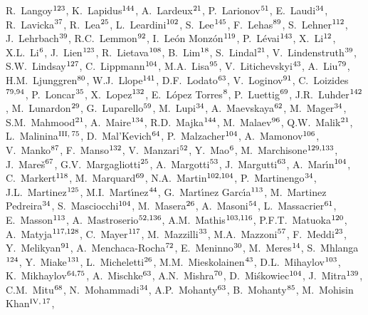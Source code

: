 \begin{flushleft}
R.~Langoy$^{\rm 123}$, 
K.~Lapidus$^{\rm 144}$, 
A.~Lardeux$^{\rm 21}$, 
P.~Larionov$^{\rm 51}$, 
E.~Laudi$^{\rm 34}$, 
R.~Lavicka$^{\rm 37}$, 
R.~Lea$^{\rm 25}$, 
L.~Leardini$^{\rm 102}$, 
S.~Lee$^{\rm 145}$, 
F.~Lehas$^{\rm 89}$, 
S.~Lehner$^{\rm 112}$, 
J.~Lehrbach$^{\rm 39}$, 
R.C.~Lemmon$^{\rm 92}$, 
I.~Le\'{o}n Monz\'{o}n$^{\rm 119}$, 
P.~L\'{e}vai$^{\rm 143}$, 
X.~Li$^{\rm 12}$, 
X.L.~Li$^{\rm 6}$, 
J.~Lien$^{\rm 123}$, 
R.~Lietava$^{\rm 108}$, 
B.~Lim$^{\rm 18}$, 
S.~Lindal$^{\rm 21}$, 
V.~Lindenstruth$^{\rm 39}$, 
S.W.~Lindsay$^{\rm 127}$, 
C.~Lippmann$^{\rm 104}$, 
M.A.~Lisa$^{\rm 95}$, 
V.~Litichevskyi$^{\rm 43}$, 
A.~Liu$^{\rm 79}$, 
H.M.~Ljunggren$^{\rm 80}$, 
W.J.~Llope$^{\rm 141}$, 
D.F.~Lodato$^{\rm 63}$, 
V.~Loginov$^{\rm 91}$, 
C.~Loizides$^{\rm 79,94}$, 
P.~Loncar$^{\rm 35}$, 
X.~Lopez$^{\rm 132}$, 
E.~L\'{o}pez Torres$^{\rm 8}$, 
P.~Luettig$^{\rm 69}$, 
J.R.~Luhder$^{\rm 142}$, 
M.~Lunardon$^{\rm 29}$, 
G.~Luparello$^{\rm 59}$, 
M.~Lupi$^{\rm 34}$, 
A.~Maevskaya$^{\rm 62}$, 
M.~Mager$^{\rm 34}$, 
S.M.~Mahmood$^{\rm 21}$, 
A.~Maire$^{\rm 134}$, 
R.D.~Majka$^{\rm 144}$, 
M.~Malaev$^{\rm 96}$, 
Q.W.~Malik$^{\rm 21}$, 
L.~Malinina$^{\rm III,}$$^{\rm 75}$, 
D.~Mal'Kevich$^{\rm 64}$, 
P.~Malzacher$^{\rm 104}$, 
A.~Mamonov$^{\rm 106}$, 
V.~Manko$^{\rm 87}$, 
F.~Manso$^{\rm 132}$, 
V.~Manzari$^{\rm 52}$, 
Y.~Mao$^{\rm 6}$, 
M.~Marchisone$^{\rm 129,133}$, 
J.~Mare\v{s}$^{\rm 67}$, 
G.V.~Margagliotti$^{\rm 25}$, 
A.~Margotti$^{\rm 53}$, 
J.~Margutti$^{\rm 63}$, 
A.~Mar\'{\i}n$^{\rm 104}$, 
C.~Markert$^{\rm 118}$, 
M.~Marquard$^{\rm 69}$, 
N.A.~Martin$^{\rm 102,104}$, 
P.~Martinengo$^{\rm 34}$, 
J.L.~Martinez$^{\rm 125}$, 
M.I.~Mart\'{\i}nez$^{\rm 44}$, 
G.~Mart\'{\i}nez Garc\'{\i}a$^{\rm 113}$, 
M.~Martinez Pedreira$^{\rm 34}$, 
S.~Masciocchi$^{\rm 104}$, 
M.~Masera$^{\rm 26}$, 
A.~Masoni$^{\rm 54}$, 
L.~Massacrier$^{\rm 61}$, 
E.~Masson$^{\rm 113}$, 
A.~Mastroserio$^{\rm 52,136}$, 
A.M.~Mathis$^{\rm 103,116}$, 
P.F.T.~Matuoka$^{\rm 120}$, 
A.~Matyja$^{\rm 117,128}$, 
C.~Mayer$^{\rm 117}$, 
M.~Mazzilli$^{\rm 33}$, 
M.A.~Mazzoni$^{\rm 57}$, 
F.~Meddi$^{\rm 23}$, 
Y.~Melikyan$^{\rm 91}$, 
A.~Menchaca-Rocha$^{\rm 72}$, 
E.~Meninno$^{\rm 30}$, 
M.~Meres$^{\rm 14}$, 
S.~Mhlanga$^{\rm 124}$, 
Y.~Miake$^{\rm 131}$, 
L.~Micheletti$^{\rm 26}$, 
M.M.~Mieskolainen$^{\rm 43}$, 
D.L.~Mihaylov$^{\rm 103}$, 
K.~Mikhaylov$^{\rm 64,75}$, 
A.~Mischke$^{\rm 63}$, 
A.N.~Mishra$^{\rm 70}$, 
D.~Mi\'{s}kowiec$^{\rm 104}$, 
J.~Mitra$^{\rm 139}$, 
C.M.~Mitu$^{\rm 68}$, 
N.~Mohammadi$^{\rm 34}$, 
A.P.~Mohanty$^{\rm 63}$, 
B.~Mohanty$^{\rm 85}$, 
M.~Mohisin Khan$^{\rm IV,}$$^{\rm 17}$, 

\end{flushleft}
